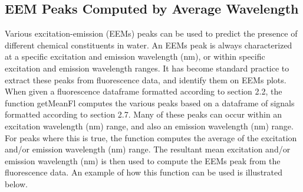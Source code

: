 \documentclass[a4paper,11pt]{article}\usepackage[]{graphicx}\usepackage[]{color}
\begin{document}
\subsection{EEM Peaks Computed by Average Wavelength}
Various excitation-emission (EEMs) peaks can be used to predict the presence of different chemical constituents in water. An EEMs peak is always characterized at a specific excitation and emission wavelength (nm), or within specific excitation and emission wavelength ranges. It has become standard practice to extract these peaks from fluorescence data, and identify them on EEMs plots. When given a fluorescence dataframe formatted according to section 2.2, the function getMeanFl computes the various peaks based on a dataframe of signals formatted according to section 2.7. Many of these peaks can occur within an excitation wavelength (nm) range, and also an emission wavelength (nm) range. For peaks where this is true, the function computes the average of the excitation and/or emission wavelength (nm) range. The resultant mean excitation and/or emission wavelength (nm) is then used to compute the EEMs peak from the fluorescence data. An example of how this function can be used is illustrated below.
\end{document}
